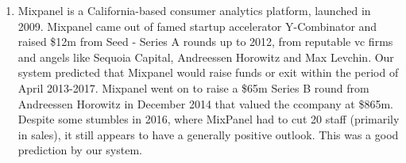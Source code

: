 ﻿\documentclass[../thesis/thesis.tex]{subfiles}
\begin{document}
\begin{enumerate}
\item Mixpanel is a California-based consumer analytics platform, launched in 2009. Mixpanel came out of famed startup accelerator Y-Combinator and raised \$12m from Seed - Series A rounds up to 2012, from reputable \gls{vc} firms and angels like Sequoia Capital, Andreessen Horowitz and Max Levchin. Our system predicted that Mixpanel would raise funds or exit within the period of April 2013-2017.  Mixpanel went on to raise a \$65m Series B round from Andreessen Horowitz in December 2014 that valued the ccompany at \$865m. Despite some stumbles in 2016, where MixPanel had to cut 20 staff (primarily in sales), it still appears to have a generally positive outlook. This was a good prediction by our system. 

\end{enumerate}

\end{document}
